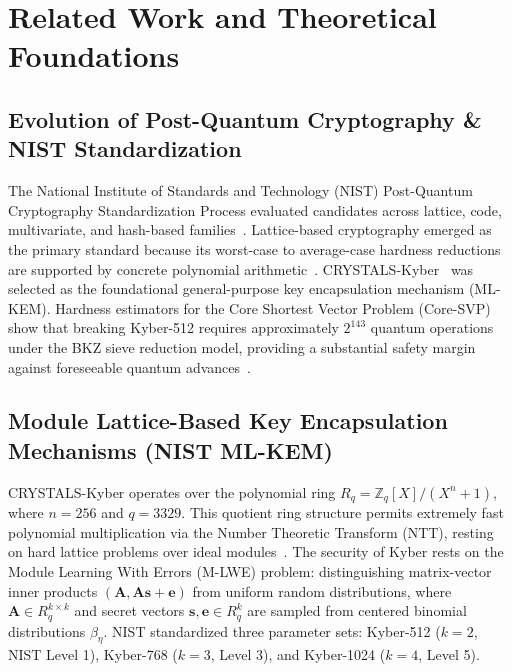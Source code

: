 \documentclass[pdflatex,sn-mathphys,Numbered]{sn-jnl}%
\theoremstyle{thmstyleone}%
\theoremstyle{thmstyletwo}%
\theoremstyle{thmstylethree}%
\begin{document}
\section{Related Work and Theoretical Foundations}\label{sec:related}

\subsection{\textbf{Evolution of Post-Quantum Cryptography \& NIST Standardization}}
The National Institute of Standards and Technology (NIST) Post-Quantum Cryptography Standardization Process evaluated candidates across lattice, code, multivariate, and hash-based families~\cite{nist2024pqc}. Lattice-based cryptography emerged as the primary standard because its worst-case to average-case hardness reductions are supported by concrete polynomial arithmetic~\cite{bernstein2017post}. CRYSTALS-Kyber~\cite{bos2018crystals} was selected as the foundational general-purpose key encapsulation mechanism (ML-KEM). Hardness estimators for the Core Shortest Vector Problem (Core-SVP) show that breaking Kyber-512 requires approximately $2^{143}$ quantum operations under the BKZ sieve reduction model, providing a substantial safety margin against foreseeable quantum advances~\cite{alagic2022status}.

\subsection{\textbf{Module Lattice-Based Key Encapsulation Mechanisms (NIST ML-KEM)}}
CRYSTALS-Kyber operates over the polynomial ring $R_q = \mathbb{Z}_q[X]/(X^n + 1)$, where $n=256$ and $q=3329$. This quotient ring structure permits extremely fast polynomial multiplication via the Number Theoretic Transform (NTT), resting on hard lattice problems over ideal modules~\cite{regev2009lattices,lyubashevsky2013ideal,peikert2016decade}. The security of Kyber rests on the Module Learning With Errors (M-LWE) problem: distinguishing matrix-vector inner products $(\mathbf{A}, \mathbf{A}\mathbf{s} + \mathbf{e})$ from uniform random distributions, where $\mathbf{A} \in R_q^{k \times k}$ and secret vectors $\mathbf{s}, \mathbf{e} \in R_q^k$ are sampled from centered binomial distributions $\beta_\eta$. NIST standardized three parameter sets: Kyber-512 ($k=2$, NIST Level 1), Kyber-768 ($k=3$, Level 3), and Kyber-1024 ($k=4$, Level 5).
\end{document}

